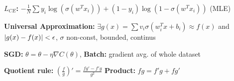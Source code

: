 \textbf{$L_{CE}$:} $- \frac{1}{N} \sum y_i \log (\sigma(w^T x_i)) + (1 - y_i) \log (1 - \sigma(w^T x_i))$ (MLE)\\
\begin{comment}
	\Note{Cross-entropy loss is a maximum likelihood estimator}\\
	\textbf{Assumption:} y's are Bernoulli $Ber(\sigma(w^T x))$ distributed.
	From there we maximise the weights over the probability:\\
	 $P(D|w) = \prod^N \sigma(w^T x_i)^{y_i} (1 - \sigma(w^T x_i))^{1 - y_i}$.\\
	Taking the negative log-likelihood results in the given loss.\\
\end{comment}

\textbf{Universal Approximation:} $\exists g(x) = \sum v_i \sigma(w_i^T x + b_i) \approx f(x)$ and $\left\lvert g(x) - f(x) \right\rvert < \epsilon$, $\sigma$ non-const, bounded, continus\\
\begin{comment}
	\textbf{Intuition:} We can create bumps with only two hidden neurons, having a lot of neurons can create many bumps to approximate any function.\\
 	\Note{$\sigma: \R \rightarrow \R$ must be non-constant, bounded and continous}\\
 	\Note{$f \in [0,1]^m$, e.g. must be in the m-dimensional hypercube}\\
\end{comment}

\textbf{SGD:} $\theta = \theta - \eta \nabla C(\theta)$, \textbf{Batch:} gradient avg. of whole dataset\\
\begin{comment}
	SGD has more fluctuations and will never reach the minimum, but dances around it.
	The convergence is usually faster though, since it updates the parameters more often\\
	Batch is doing one update per epoch, inefficient if there are a lot of samples in the dataset\\
\end{comment}

\textbf{Quotient rule:} $(\frac{f}{g})' = \frac{fg' - f'g}{g^2}$ 
\textbf{Product:} $fg = f'g + fg'$\\



 
 

